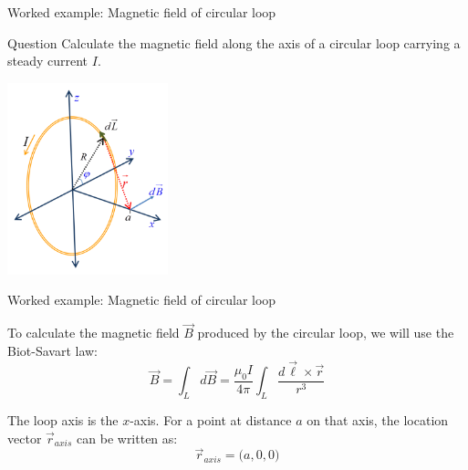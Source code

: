 
%
%

{
\problemslide

%
%
%

\begin{frame}{Worked example: Magnetic field of circular loop}

  \begin{blockexmplque}{Question}
    Calculate the magnetic field along the axis of a circular loop
    carrying a steady current $I$.
    \vspace{0.1cm}
    \begin{center}
      \includegraphics[width=0.35\textwidth]{./images/problems/lect05_circular_loop_b_field.png}\\
    \end{center}
  \end{blockexmplque}

\end{frame}

%
%
%

\begin{frame}{Worked example: Magnetic field of circular loop}

  To calculate the magnetic field $\vec{B}$ produced
  by the circular loop, we will use the Biot-Savart law:
  \begin{equation*}
     \vec{B} = \int_{L} d\vec{B} =
      \frac{\mu_0 I}{4\pi} \int_{L} \frac{d\vec{\ell} \times \vec{r}}{r^3}
  \end{equation*}

  The loop axis is the $x$-axis.
  For a point at distance $a$ on that axis,
  the location vector $\vec{r}_{axis}$
  can be written as:
  \begin{equation*}
     \vec{r}_{axis} = \Big(a, 0, 0\Big)
  \end{equation*}


\end{frame}}
